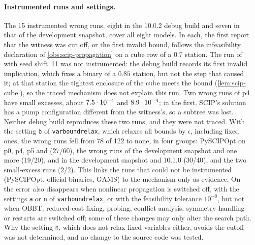 \paragraph{Instrumented runs and settings.}
The 15 instrumented wrong runs, eight in the 10.0.2 debug build and seven in that of the development snapshot, cover all eight models.
In each, the first report that the witness was cut off, or the first invalid bound, follows the infeasibility declaration of \cref{obs:scip-propagation} on a cube row of a $0.7$ station.
The run of  with seed shift~11 was not instrumented: the debug build records its first invalid implication, which fixes a binary of a $0.85$ station, but not the step that caused it; at that station the tightest enclosure of the cube meets the bound (\cref{lem:scip-cube}), so the traced mechanism does not explain this run.
Two wrong runs of p4 have small excesses, about $7.5\cdot 10^{-4}$ and $8.9\cdot 10^{-4}$; in the first, SCIP's solution has a pump configuration different from the witness's, so a subtree was lost.
Neither debug build reproduces these two runs, and they were not traced.
With the setting \texttt{b} of \texttt{varboundrelax}, which relaxes all bounds by $\epsilon$, including fixed ones, the wrong runs fell from 78 of 122 to none, in four groups: PySCIPOpt on p0, p4, p5 and  (27/60), the wrong runs of the development snapshot and one more (19/20),  and  in the development snapshot and 10.1.0 (30/40), and the two small-excess runs (2/2).
This links the runs that could not be instrumented (PySCIPOpt, official binaries, GAMS) to the mechanism only as evidence.
On  the error also disappears when nonlinear propagation is switched off, with the settings \texttt{a} or \texttt{n} of \texttt{varboundrelax}, or with the feasibility tolerance $10^{-9}$, but not when OBBT, reduced-cost fixing, probing, conflict analysis, symmetry handling or restarts are switched off; some of these changes may only alter the search path.
Why the setting \texttt{n}, which does not relax fixed variables either, avoids the cutoff was not determined, and no change to the source code was tested.

